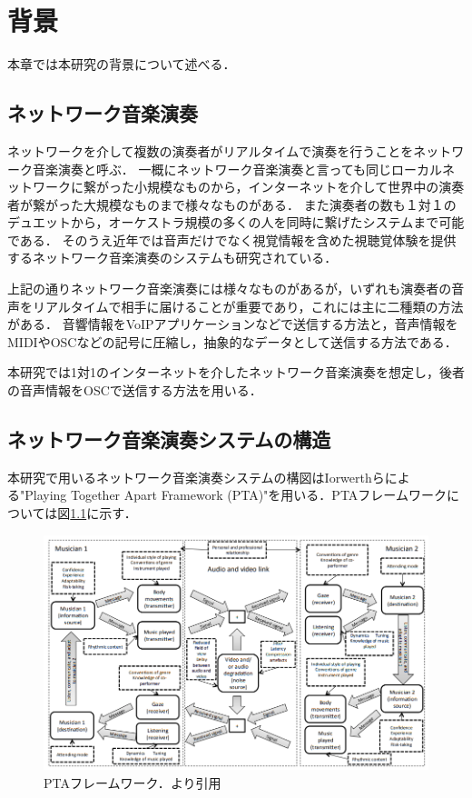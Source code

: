 \chapter{背景}
\label{background}

本章では本研究の背景について述べる．

\section{ネットワーク音楽演奏}
ネットワークを介して複数の演奏者がリアルタイムで演奏を行うことをネットワーク音楽演奏と呼ぶ．
一概にネットワーク音楽演奏と言っても同じローカルネットワークに繋がった小規模なものから，インターネットを介して世界中の演奏者が繋がった大規模なものまで様々なものがある．
また演奏者の数も１対１のデュエットから，オーケストラ規模の多くの人を同時に繋げたシステムまで可能である．
そのうえ近年では音声だけでなく視覚情報を含めた視聴覚体験を提供するネットワーク音楽演奏のシステムも研究されている．

上記の通りネットワーク音楽演奏には様々なものがあるが，いずれも演奏者の音声をリアルタイムで相手に届けることが重要であり，これには主に二種類の方法がある．
音響情報をVoIPアプリケーションなどで送信する方法と，音声情報をMIDIやOSCなどの記号に圧縮し，抽象的なデータとして送信する方法である．

本研究では1対1のインターネットを介したネットワーク音楽演奏を想定し，後者の音声情報をOSCで送信する方法を用いる．

\section{ネットワーク音楽演奏システムの構造}
\label{background:structure}
本研究で用いるネットワーク音楽演奏システムの構図はIorwerthらによる"Playing Together Apart Framework (PTA)"を用いる．PTAフレームワークについては図\ref{fig:structure}に示す．

\begin{figure}[htbp]
  \centering
  \includegraphics[width=0.8\linewidth]{src/playing_together_apart_framework.png}
  \caption{PTAフレームワーク．\cite{pta}より引用}
  \label{fig:structure}
\end{figure}

